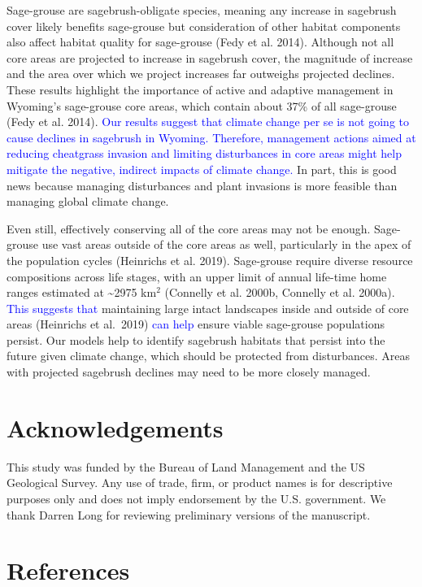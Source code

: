\documentclass[
  12pt,
]{article}
\begin{document}
Sage-grouse are sagebrush-obligate species, meaning any increase in sagebrush cover likely benefits sage-grouse but consideration of other habitat components also affect habitat quality for sage-grouse (Fedy et al. 2014).
Although not all core areas are projected to increase in sagebrush cover, the magnitude of increase and the area over which we project increases far outweighs projected declines.
These results highlight the importance of active and adaptive management in Wyoming's sage-grouse core areas, which contain about 37\% of all sage-grouse (Fedy et al. 2014).
\textcolor{blue}{Our results suggest that climate change per se is not going to cause declines in sagebrush in Wyoming.}
\textcolor{blue}{Therefore, management actions aimed at reducing cheatgrass invasion and limiting disturbances in core areas might help mitigate the negative, indirect impacts of climate change.}
In part, this is good news because managing disturbances and plant invasions is more feasible than managing global climate change.

Even still, effectively conserving all of the core areas may not be enough.
Sage-grouse use vast areas outside of the core areas as well, particularly in the apex of the population cycles (Heinrichs et al. 2019).
Sage-grouse require diverse resource compositions across life stages, with an upper limit of annual life-time home ranges estimated at \textasciitilde2975 km\(^2\) (Connelly et al. 2000b, Connelly et al. 2000a).
\textcolor{blue}{This suggests that} maintaining large intact landscapes inside and outside of core areas (Heinrichs et al.~2019) \textcolor{blue}{can help} ensure viable sage-grouse populations persist.
Our models help to identify sagebrush habitats that persist into the future given climate change, which should be protected from disturbances.
Areas with projected sagebrush declines may need to be more closely managed.

\hypertarget{acknowledgements}{%
\section{Acknowledgements}\label{acknowledgements}}

This study was funded by the Bureau of Land Management and the US Geological Survey.
Any use of trade, firm, or product names is for descriptive purposes only and does not imply endorsement by the U.S. government.
We thank Darren Long for reviewing preliminary versions of the manuscript.

\hypertarget{references}{%
\section{References}\label{references}}
\end{document}
